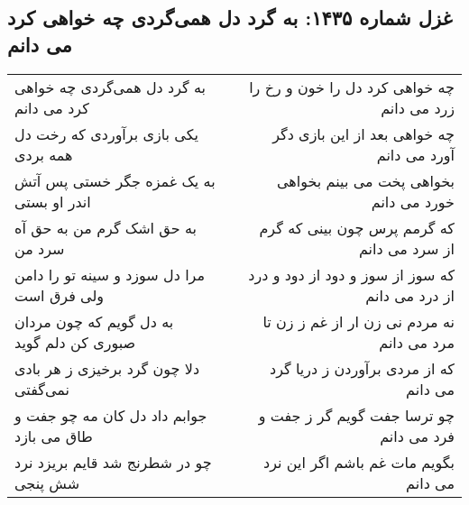 \begin{center}
\section*{غزل شماره ۱۴۳۵: به گرد دل همی‌گردی چه خواهی کرد می دانم}
\label{sec:1435}
\begin{longtable}{l p{0.5cm} r}
به گرد دل همی‌گردی چه خواهی کرد می دانم
&&
چه خواهی کرد دل را خون و رخ را زرد می دانم
\\
یکی بازی برآوردی که رخت دل همه بردی
&&
چه خواهی بعد از این بازی دگر آورد می دانم
\\
به یک غمزه جگر خستی پس آتش اندر او بستی
&&
بخواهی پخت می بینم بخواهی خورد می دانم
\\
به حق اشک گرم من به حق آه سرد من
&&
که گرمم پرس چون بینی که گرم از سرد می دانم
\\
مرا دل سوزد و سینه تو را دامن ولی فرق است
&&
که سوز از سوز و دود از دود و درد از درد می دانم
\\
به دل گویم که چون مردان صبوری کن دلم گوید
&&
نه مردم نی زن ار از غم ز زن تا مرد می دانم
\\
دلا چون گرد برخیزی ز هر بادی نمی‌گفتی
&&
که از مردی برآوردن ز دریا گرد می دانم
\\
جوابم داد دل کان مه چو جفت و طاق می بازد
&&
چو ترسا جفت گویم گر ز جفت و فرد می دانم
\\
چو در شطرنج شد قایم بریزد نرد شش پنجی
&&
بگویم مات غم باشم اگر این نرد می دانم
\\
\end{longtable}
\end{center}
